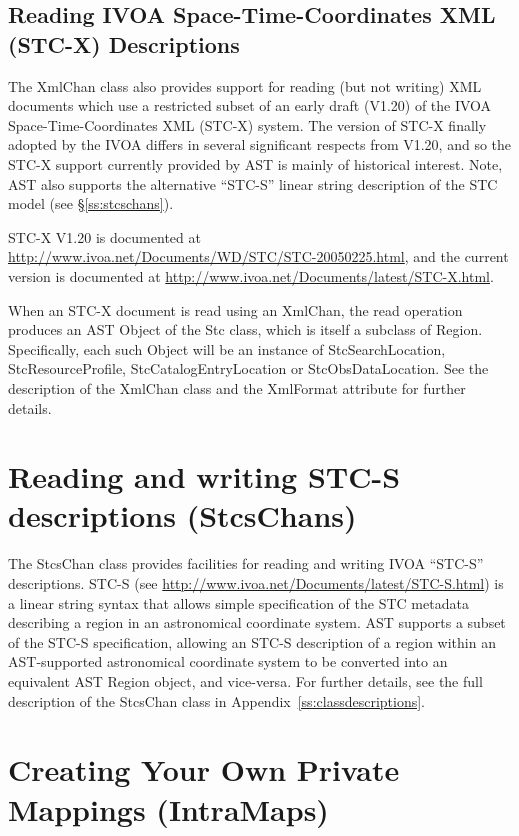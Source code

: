 \documentclass[twoside,11pt]{starlink}
\providecommand{\appref}[1]{Appendix~\ref{#1}}
\providecommand{\secref}[1]{\S\ref{#1}}
\begin{document}
\subsection{Reading IVOA Space-Time-Coordinates XML (STC-X) Descriptions}
The XmlChan class also provides support for reading (but not writing) XML
documents which use a restricted subset of an early draft (V1.20) of the
IVOA Space-Time-Coordinates XML (STC-X) system. The version of STC-X
finally adopted by the IVOA differs in several significant respects from
V1.20, and so the STC-X support currently provided by AST is mainly of
historical interest. Note, AST also supports the alternative ``STC-S''
linear string description of the STC model (see \secref{ss:stcschans}).

STC-X V1.20 is documented at
\url{http://www.ivoa.net/Documents/WD/STC/STC-20050225.html}, and the current
version is documented at
\url{http://www.ivoa.net/Documents/latest/STC-X.html}.

When an STC-X document is read using an XmlChan, the read operation
produces an AST Object of the Stc class, which is itself a subclass of
Region. Specifically, each such Object will be an instance of
StcSearchLocation, StcResourceProfile, StcCatalogEntryLocation or
StcObsDataLocation. See the description of the XmlChan class and the
XmlFormat attribute for further details.

\cleardoublepage
\section{\label{ss:stcschans}Reading and writing STC-S descriptions (StcsChans)}

The StcsChan class provides facilities for reading and writing
IVOA ``STC-S'' descriptions. STC-S (see
\url{http://www.ivoa.net/Documents/latest/STC-S.html}) is a linear string
syntax that allows simple specification of the STC metadata describing a
region in an astronomical coordinate system. AST supports a
subset of the STC-S specification, allowing an STC-S description of a
region within an AST-supported astronomical coordinate system to be converted
into an equivalent AST Region object, and vice-versa. For further
details, see the full description of the StcsChan class in
\appref{ss:classdescriptions}.

\cleardoublepage
\section{\label{ss:intramaps}Creating Your Own Private Mappings (IntraMaps)}
\end{document}
